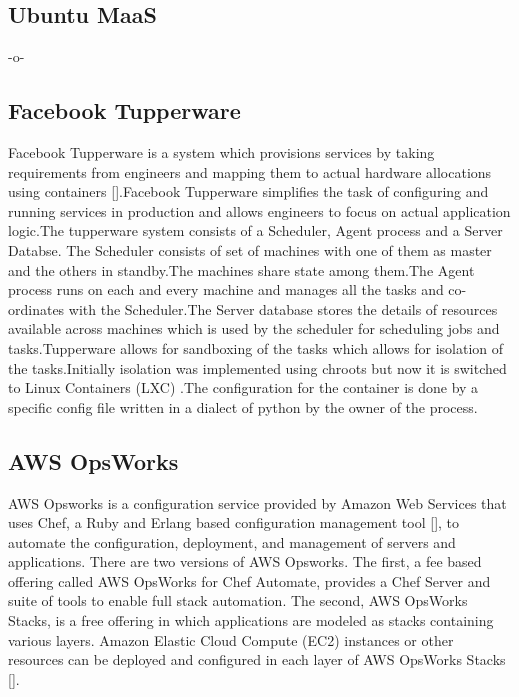 \subsection{Ubuntu MaaS}

-o-

\subsection{Facebook Tupperware}

Facebook Tupperware is a system which provisions services by taking
requirements from engineers and mapping them to actual hardware
allocations using containers [\cite{www-FaceTup}].Facebook Tupperware
simplifies the task of configuring and running services in production
and allows engineers to focus on actual application logic.The
tupperware system consists of a Scheduler, Agent process and a Server
Databse.  The Scheduler consists of set of machines with one of them
as master and the others in standby.The machines share state among
them.The Agent process runs on each and every machine and manages all
the tasks and co-ordinates with the Scheduler.The Server database
stores the details of resources available across machines which is
used by the scheduler for scheduling jobs and tasks.Tupperware allows
for sandboxing of the tasks which allows for isolation of the
tasks.Initially isolation was implemented using chroots but now it is
switched to Linux Containers (LXC) .The configuration for the
container is done by a specific config file written in a dialect of
python by the owner of the process.

\subsection{AWS OpsWorks}

AWS Opsworks is a configuration service provided by Amazon Web
Services that uses Chef, a Ruby and Erlang based configuration
management tool [\cite{www-wikichef}], to automate the configuration,
deployment, and management of servers and applications. There are two
versions of AWS Opsworks.  The first, a fee based offering called AWS
OpsWorks for Chef Automate, provides a Chef Server and suite of tools
to enable full stack automation. The second, AWS OpsWorks Stacks, is a
free offering in which applications are modeled as stacks containing
various layers. Amazon Elastic Cloud Compute (EC2) instances or other
resources can be deployed and configured in each layer of AWS OpsWorks
Stacks [\cite{www-awsopsworks}].

